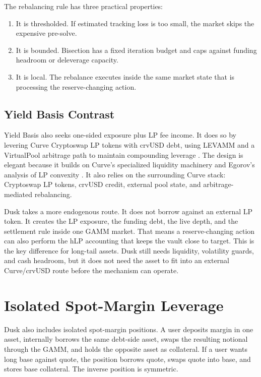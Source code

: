 \documentclass[11pt]{article}
\begin{document}
The rebalancing rule has three practical properties:
\begin{enumerate}
  \item It is thresholded. If estimated tracking loss is too small, the market skips the expensive pre-solve.
  \item It is bounded. Bisection has a fixed iteration budget and caps against funding headroom or deleverage capacity.
  \item It is local. The rebalance executes inside the same market state that is processing the reserve-changing action.
\end{enumerate}

\subsection{Yield Basis Contrast}

Yield Basis also seeks one-sided exposure plus LP fee income. It does so by levering Curve Cryptoswap LP tokens with crvUSD debt, using LEVAMM and a VirtualPool arbitrage path to maintain compounding leverage \cite{yieldbasis-technical,yieldbasis-governance}. The design is elegant because it builds on Curve's specialized liquidity machinery and Egorov's analysis of LP convexity \cite{egorov-yieldbasis-whitepaper}. It also relies on the surrounding Curve stack: Cryptoswap LP tokens, crvUSD credit, external pool state, and arbitrage-mediated rebalancing.

Dusk takes a more endogenous route. It does not borrow against an external LP token. It creates the LP exposure, the funding debt, the live depth, and the settlement rule inside one GAMM market. That means a reserve-changing action can also perform the hLP accounting that keeps the vault close to target. This is the key difference for long-tail assets. Dusk still needs liquidity, volatility guards, and cash headroom, but it does not need the asset to fit into an external Curve/crvUSD route before the mechanism can operate.

\section{Isolated Spot-Margin Leverage}

Dusk also includes isolated spot-margin positions. A user deposits margin in one asset, internally borrows the same debt-side asset, swaps the resulting notional through the GAMM, and holds the opposite asset as collateral. If a user wants long base against quote, the position borrows quote, swaps quote into base, and stores base collateral. The inverse position is symmetric.
\end{document}
